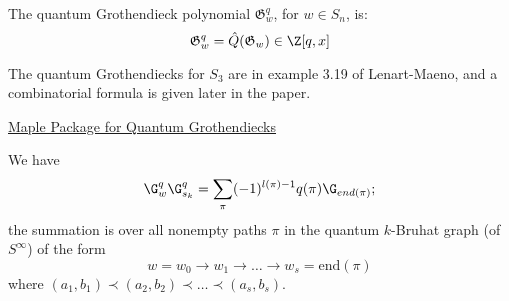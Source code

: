 \begin{definition}
    The quantum Grothendieck polynomial $\mathfrak{G}_w^q$, for $w \in S_n$, is:
    \begin{equation*}
        \mathfrak{G}_w^q = \hat{Q}(\mathfrak{G}_w) \in \Z[q,x]
    \end{equation*}
\end{definition}
The quantum Grothendiecks for $S_3$ are in example 3.19 of Lenart-Maeno, and a combinatorial formula is given later in the paper.

\href{https://ow3.math.rutgers.edu/~asbuch/equivcalc/}{Maple Package for Quantum Grothendiecks}

\begin{theorem}

We have
\begin{equation*}
    \G_w^q \G_{s_k}^q = \sum_\pi (-1)^{l(\pi)- 1}q(\pi) \G_{end(\pi)} ; 
\end{equation*}
the summation is over all nonempty paths $\pi$ in the quantum $k$-Bruhat graph (of $S^\infty$) of the form 
\begin{equation*}
    w = w_0 \rightarrow w_1 \rightarrow \ldots \rightarrow w_s = \text{end}(\pi)
\end{equation*}
where $(a_1, b_1) \prec (a_2,b_2) \prec \ldots \prec (a_s,b_s)$.
\end{theorem}



